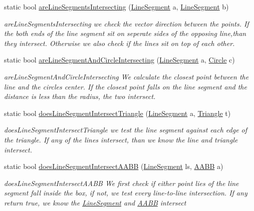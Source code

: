 \begin{DoxyCompactItemize}
static bool \hyperlink{class_intersect_tester_a0552b121b444528907c1958c02fb217b}{are\+Line\+Segments\+Intersecting} (\hyperlink{class_line_segment}{Line\+Segment} a, \hyperlink{class_line_segment}{Line\+Segment} b)
\begin{DoxyCompactList}\small\item\em are\+Line\+Segments\+Intersecting we check the vector direction between the points. If the both ends of the line segment sit on seperate sides of the opposing line,than they intersect. Otherwise we also check if the lines sit on top of each other. \end{DoxyCompactList}\item 
static bool \hyperlink{class_intersect_tester_a36c9fcad6ad5607f5a47369aeb2b57c3}{are\+Line\+Segment\+And\+Circle\+Intersecting} (\hyperlink{class_line_segment}{Line\+Segment} a, \hyperlink{class_circle}{Circle} c)
\begin{DoxyCompactList}\small\item\em are\+Line\+Segment\+And\+Circle\+Intersecting We calculate the closest point between the line and the circle\textquotesingle{}s center. If the closest point falls on the line segment and the distance is less than the radius, the two intersect. \end{DoxyCompactList}\item 
static bool \hyperlink{class_intersect_tester_a7e7603c33cc5921adb9d0d24eb76ebc9}{does\+Line\+Segment\+Intersect\+Triangle} (\hyperlink{class_line_segment}{Line\+Segment} a, \hyperlink{class_triangle}{Triangle} t)
\begin{DoxyCompactList}\small\item\em does\+Line\+Segment\+Intersect\+Triangle we test the line segment against each edge of the triangle. If any of the lines intersect, than we know the line and triangle intersect. \end{DoxyCompactList}\item 
static bool \hyperlink{class_intersect_tester_a817105ec3f73e20066121d7d9d85a3ae}{does\+Line\+Segment\+Intersect\+A\+A\+BB} (\hyperlink{class_line_segment}{Line\+Segment} ls, \hyperlink{class_a_a_b_b}{A\+A\+BB} a)
\begin{DoxyCompactList}\small\item\em does\+Line\+Segment\+Intersect\+A\+A\+BB We first check if either point lies of the line segment fall inside the box, if not, we test every line-\/to-\/line intersection. If any return true, we know the \hyperlink{class_line_segment}{Line\+Segment} and \hyperlink{class_a_a_b_b}{A\+A\+BB} intersect \end{DoxyCompactList}\item 

\end{DoxyCompactItemize}
